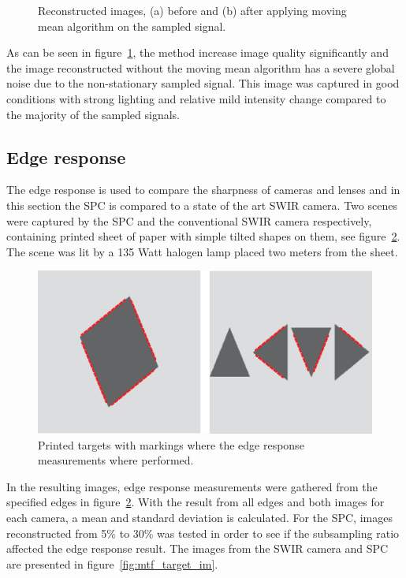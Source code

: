 \begin{figure}[H]
\begin{minipage}[t]{0.49\textwidth}
	\subcaption{}
	\label{lc_af}
\end{minipage}
	\caption{Reconstructed images, (a) before and (b) after applying moving mean algorithm on the sampled signal.}
	\label{fig:lc_image}
\end{figure}

As can be seen in figure~\ref{fig:lc_image}, the method increase image quality significantly and the image reconstructed without the moving mean algorithm has a severe global noise due to the non-stationary sampled signal. This image was captured in good conditions with strong lighting and relative mild intensity change compared to the majority of the sampled signals.


\subsection{Edge response}
The edge response is used to compare the sharpness of cameras and lenses and in this section the SPC is compared to a state of the art SWIR camera. Two scenes were captured by the SPC and the conventional SWIR camera respectively, containing printed sheet of paper with simple tilted shapes on them, see figure~\ref{fig:mtf_target}. The scene was lit by a 135 Watt halogen lamp placed two meters from the sheet.

\begin{figure}[H]
    \centering
    \includegraphics[width=0.8\linewidth]{result/mtf/Target.eps}
    \caption{Printed targets with markings where the edge response measurements where performed.}
    \label{fig:mtf_target}
\end{figure}

In the resulting images, edge response measurements were gathered from the specified edges in figure~\ref{fig:mtf_target}. With the result from all edges and both images for each camera, a mean and standard deviation is calculated. For the SPC, images reconstructed from 5\% to 30\% was tested in order to see if the subsampling ratio affected the edge response result. The images from the SWIR camera and SPC are presented in figure~\ref{fig:mtf_target_im}.

